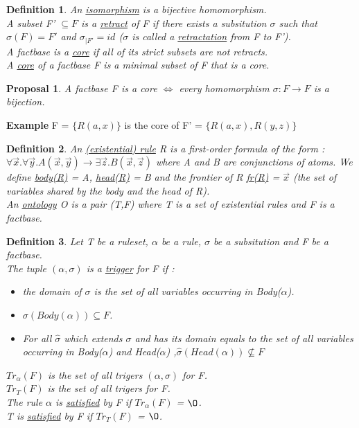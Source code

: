 \documentclass{article}
\newtheorem{pro}{Proposal}
\newtheorem{defi}{Definition}
\begin{document}
\begin{defi}
An \underline{isomorphism} is a bijective homomorphism. \\
A subset F' $\subseteq F$ is a \underline{retract} of F if there exists a subsitution $\sigma$ such that $\sigma(F) = F'$ and $\sigma_{|F'}=id$ ($\sigma$ is called a \underline{retractation} from F to F'). \\
A factbase is a \underline{core} if all of its strict subsets are not retracts. \\
A \underline{core} of a factbase F is a minimal subset of F that is a core.
\end{defi}

\begin{pro}
A factbase F is a core $\Leftrightarrow$ every homomorphism $\sigma: F \to F$ is a bijection.
\end{pro}

\noindent \textbf{Example} F = $\{R(a,x)\}$ is the core of F' = $\{R(a,x),R(y,z)\}$

\begin{defi}
An \underline{(existential) rule} R is a first-order formula	 of the form : $\forall \vec x.\forall \vec y. A(\vec x,\vec y) \rightarrow \exists \vec z. B(\vec x,\vec z)$ where  A and B are conjunctions of atoms. We define \underline{body(R)} = A, \underline{head(R)} = B and the frontier of R \underline{fr(R)} = $\vec x$ (the set of variables shared by the body and the head of R). \\
An \underline{ontology} O is a pair (T,F) where T is a set of existential rules and F is a factbase.
\end{defi}

\begin{defi}
Let T be a ruleset, $\alpha$ be a rule, $\sigma$ be a subsitution and F be a factbase. \\
The tuple $(\alpha,\sigma)$ is a \underline{trigger} for F if : 
\begin{itemize}
\item the domain of $\sigma$ is the set of all variables occurring in Body($\alpha$).
\item $\sigma(Body(\alpha)) \subseteq F$.
\item For all $\hat \sigma$ which extends $\sigma$ and has its domain equals to the set of all variables occurring in Body($\alpha$) and Head($\alpha$) ,$\hat \sigma(Head(\alpha)) \nsubseteq F$
\end{itemize}
\underline{$Tr_{\alpha}(F)$} is the set of all trigers $(\alpha,\sigma)$ for F. \\
\underline{$Tr_{T}(F)$} is the set of all trigers for F. \\
The rule $\alpha$ is \underline{satisfied} by F if $Tr_{\alpha}(F)$ = $\O$. \\
T is \underline{satisfied} by F if $Tr_{T}(F)$ = $\O$.
\end{defi}
\end{document}
